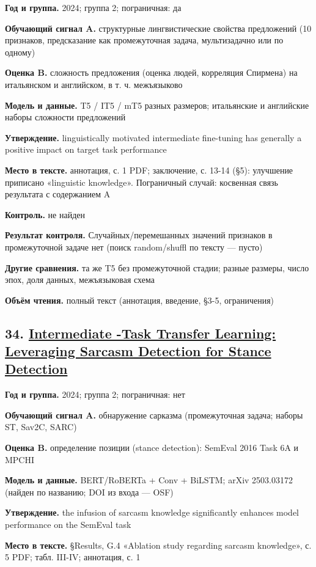 \textbf{Год и группа.} 2024; группа 2; пограничная: да

\textbf{Обучающий сигнал A.} структурные лингвистические свойства предложений (10 признаков, предсказание как промежуточная задача, мультизадачно или по одному)

\textbf{Оценка B.} сложность предложения (оценка людей, корреляция Спирмена) на итальянском и английском, в т. ч. межъязыково

\textbf{Модель и данные.} T5 / IT5 / mT5 разных размеров; итальянские и английские наборы сложности предложений

\textbf{Утверждение.} linguistically motivated intermediate fine-tuning has generally a positive impact on target task performance

\textbf{Место в тексте.} аннотация, с. 1 PDF; заключение, с. 13-14 (§5): улучшение приписано «linguistic knowledge». Пограничный случай: косвенная связь результата с содержанием A

\textbf{Контроль.} не найден

\textbf{Результат контроля.} Случайных/перемешанных значений признаков в промежуточной задаче нет (поиск random/shuffl по тексту — пусто)

\textbf{Другие сравнения.} та же T5 без промежуточной стадии; разные размеры, число эпох, доля данных, межъязыковая схема

\textbf{Объём чтения.} полный текст (аннотация, введение, §3-5, ограничения)


\subsection*{34. \href{https://doi.org/10.17605/osf.io/pwr3t}{Intermediate -Task Transfer Learning: Leveraging Sarcasm Detection for Stance Detection}}

\textbf{Год и группа.} 2024; группа 2; пограничная: нет

\textbf{Обучающий сигнал A.} обнаружение сарказма (промежуточная задача; наборы ST, Sav2C, SARC)

\textbf{Оценка B.} определение позиции (stance detection): SemEval 2016 Task 6A и MPCHI

\textbf{Модель и данные.} BERT/RoBERTa + Conv + BiLSTM; arXiv 2503.03172 (найден по названию; DOI из входа — OSF)

\textbf{Утверждение.} the infusion of sarcasm knowledge significantly enhances model performance on the SemEval task

\textbf{Место в тексте.} §Results, G.4 «Ablation study regarding sarcasm knowledge», с. 5 PDF; табл. III-IV; аннотация, с. 1


